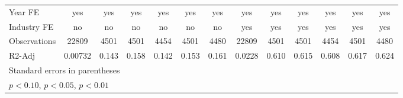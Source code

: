 {\begin{tabular}{l*{12}{c}}
\hline
Year FE             &         yes         &         yes         &         yes         &         yes         &         yes         &         yes         &         yes         &         yes         &         yes         &         yes         &         yes         &         yes         \\
Industry FE         &          no         &          no         &          no         &          no         &          no         &          no         &         yes         &         yes         &         yes         &         yes         &         yes         &         yes         \\
Observations        &       22809         &        4501         &        4501         &        4454         &        4501         &        4480         &       22809         &        4501         &        4501         &        4454         &        4501         &        4480         \\
R2-Adj              &     0.00732         &       0.143         &       0.158         &       0.142         &       0.153         &       0.161         &      0.0228         &       0.610         &       0.615         &       0.608         &       0.617         &       0.624         \\
\hline\hline
\multicolumn{13}{l}{\footnotesize Standard errors in parentheses}\\
\multicolumn{13}{l}{\footnotesize \sym{*} \(p<0.10\), \sym{**} \(p<0.05\), \sym{***} \(p<0.01\)}\\
\end{tabular}
}
